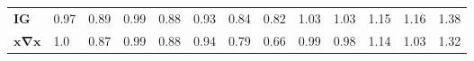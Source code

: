 \begin{tabular}{lllllllllllll}
\textbf{IG}                               &                                       0.97 &                                           0.89 &                                      0.99 &                                           0.88 &                       0.93 &                           0.84 &                      0.82 &                           1.03 &                             1.03 &                                 1.15 &                            1.16 &                                 1.38 \\
$\boldsymbol{\mathbf{x}\nabla\mathbf{x}}$ &                                        1.0 &                                           0.87 &                                      0.99 &                                           0.88 &                       0.94 &                           0.79 &                      0.66 &                           0.99 &                             0.98 &                                 1.14 &                            1.03 &                                 1.32 \\
\bottomrule
\end{tabular}
